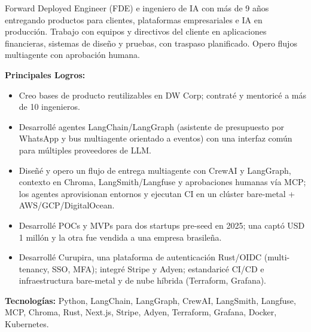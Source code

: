 \documentclass[10pt,a4paper]{altacv}
\begin{document}

\begin{fullwidth}
\makecvheader
\end{fullwidth}



Forward Deployed Engineer (FDE) e ingeniero de IA con más de 9 años entregando productos para clientes, plataformas empresariales e IA en producción. Trabajo con equipos y directivos del cliente en aplicaciones financieras, sistemas de diseño y pruebas, con traspaso planificado. Opero flujos multiagente con aprobación humana.



\textbf{Principales Logros:}
\begin{itemize}
\setlength{\itemindent}{0.5em}
\item[--] Creo bases de producto reutilizables en DW Corp; contraté y mentoricé a más de 10 ingenieros.
\item[--] Desarrollé agentes LangChain/LangGraph (asistente de presupuesto por WhatsApp y bus multiagente orientado a eventos) con una interfaz común para múltiples proveedores de LLM.
\item[--] Diseñé y opero un flujo de entrega multiagente con CrewAI y LangGraph, contexto en Chroma, LangSmith/Langfuse y aprobaciones humanas vía MCP; los agentes aprovisionan entornos y ejecutan CI en un clúster bare-metal + AWS/GCP/DigitalOcean.
\item[--] Desarrollé POCs y MVPs para dos startups pre-seed en 2025; una captó USD 1 millón y la otra fue vendida a una empresa brasileña.
\item[--] Desarrollé Curupira, una plataforma de autenticación Rust/OIDC (multi-tenancy, SSO, MFA); integré Stripe y Adyen; estandaricé CI/CD e infraestructura bare-metal y de nube híbrida (Terraform, Grafana).
\end{itemize}
\textbf{Tecnologías:} Python, LangChain, LangGraph, CrewAI, LangSmith, Langfuse, MCP, Chroma, Rust, Next.js, Stripe, Adyen, Terraform, Grafana, Docker, Kubernetes.
\vspace{2mm}
\end{document}
